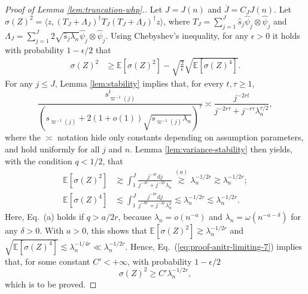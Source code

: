 \documentclass[11pt,a4paper]{article}
\renewcommand{\hat}{\widehat}
\renewcommand{\bar}{\overline}
\theoremstyle{definition}
\theoremstyle{plain}
\theoremstyle{remark}
\newcommand{\ud}{\mathrm d}
\begin{document}
\begin{proof}[Proof of Lemma \ref{lem:truncation-whp}.]
Let $J=J(n)$ and $\bar J=C_JJ(n)$.
Let $\sigma(Z)^2 = \langle z, (T_J+\Lambda_J)^\dagger T_J(T_J+\Lambda_J)^\dagger z\rangle$, where $T_J=\sum_{j=1}^J\hat s_j\hat\psi_j\otimes\hat\psi_j$
and $\Lambda_J = \sum_{j=1}^J 2\sqrt{\hat s_j\lambda_n}\hat\psi_j\otimes\hat\psi_j$.
Using Chebyshev's inequality, for any $\epsilon>0$ it holds with probability $1-\epsilon/2$ that
\begin{align}
\sigma(Z)^2 &\geq \mathbb E[\sigma(Z)^2] - \sqrt{\frac{2}{\epsilon}}\sqrt{\mathbb E[\sigma(Z)^4]}.
\label{eq:proof-anitr-limiting-7}
\end{align}
For any $j\leq J$, Lemma \ref{lem:stability} implies that, for every $t,\tau\geq 1$, 
$$
\frac{s_{\varpi^{-1}(j)}^t}{(s_{\varpi^{-1}(j)}+2(1+o(1))\sqrt{s_{\varpi^{-1}(j)}\lambda_n})^\tau} \asymp \frac{j^{-2rt}}{j^{-2r\tau}+j^{-r\tau}\lambda_n^{\tau/2}},
$$
where the $\asymp$ notation hide only constants depending on assumption parameters, and hold uniformly for all $j$ and $n$. Lemma \ref{lem:variance-stability} then yields,
with the condition $q<1/2$, that
\begin{align*}
\mathbb E[\sigma(Z)^2] &\gtrsim \int_1^J\frac{j^{-4r}\ud j}{j^{-4r}+j^{-2r}\lambda_n}\overset{(a)}{\gtrsim} \lambda_n^{-1/2r}  \gtrsim  \lambda_n^{-1/2r};\\
\mathbb E[\sigma(Z)^4] &\lesssim \int_1^J\frac{j^{-8r}\ud j}{j^{-8r}+j^{-4r}\lambda_n^2}
\lesssim \lambda_n^{-1/2r} \lesssim \lambda_n^{-1/2r}.
\end{align*}
Here, Eq.~(a) holds if $q>a/2r$, because $\lambda_n =o(n^{-a})$ and $\lambda_n=\omega(n^{-a-\delta})$ for any $\delta>0$.
With $a>0$, this shows that $\mathbb E[\sigma(Z)^2]\gtrsim\lambda_n^{-1/2r}$ and $\sqrt{\mathbb E[\sigma(Z)^4]}\lesssim \lambda_n^{-1/4r} \ll \lambda_n^{-1/2r}$.
Hence, Eq.~(\ref{eq:proof-anitr-limiting-7}) implies that, for some constant $C'<+\infty$, with probability $1-\epsilon/2$ 
\begin{equation*}
\sigma(Z)^2 \geq C'\lambda_n^{-1/2r},
\end{equation*}
which is to be proved.

\end{proof}
\end{document}
